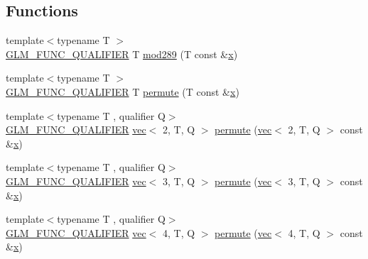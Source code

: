 \subsection*{Functions}
\begin{DoxyCompactItemize}
\item 
{\footnotesize template$<$typename T $>$ }\\\mbox{\hyperlink{setup_8hpp_a33fdea6f91c5f834105f7415e2a64407}{G\+L\+M\+\_\+\+F\+U\+N\+C\+\_\+\+Q\+U\+A\+L\+I\+F\+I\+ER}} T \mbox{\hyperlink{namespaceglm_1_1detail_a9968154b610b2b78f492b2f7babd728c}{mod289}} (T const \&\mbox{\hyperlink{_s_d_l__opengl_8h_ad0e63d0edcdbd3d79554076bf309fd47}{x}})
\item 
{\footnotesize template$<$typename T $>$ }\\\mbox{\hyperlink{setup_8hpp_a33fdea6f91c5f834105f7415e2a64407}{G\+L\+M\+\_\+\+F\+U\+N\+C\+\_\+\+Q\+U\+A\+L\+I\+F\+I\+ER}} T \mbox{\hyperlink{namespaceglm_1_1detail_adce908e01ac22b5e55c29bacbf6a37a5}{permute}} (T const \&\mbox{\hyperlink{_s_d_l__opengl_8h_ad0e63d0edcdbd3d79554076bf309fd47}{x}})
\item 
{\footnotesize template$<$typename T , qualifier Q$>$ }\\\mbox{\hyperlink{setup_8hpp_a33fdea6f91c5f834105f7415e2a64407}{G\+L\+M\+\_\+\+F\+U\+N\+C\+\_\+\+Q\+U\+A\+L\+I\+F\+I\+ER}} \mbox{\hyperlink{structglm_1_1vec}{vec}}$<$ 2, T, Q $>$ \mbox{\hyperlink{namespaceglm_1_1detail_a442b75a1f3ea4e2660ce0047245581ee}{permute}} (\mbox{\hyperlink{structglm_1_1vec}{vec}}$<$ 2, T, Q $>$ const \&\mbox{\hyperlink{_s_d_l__opengl_8h_ad0e63d0edcdbd3d79554076bf309fd47}{x}})
\item 
{\footnotesize template$<$typename T , qualifier Q$>$ }\\\mbox{\hyperlink{setup_8hpp_a33fdea6f91c5f834105f7415e2a64407}{G\+L\+M\+\_\+\+F\+U\+N\+C\+\_\+\+Q\+U\+A\+L\+I\+F\+I\+ER}} \mbox{\hyperlink{structglm_1_1vec}{vec}}$<$ 3, T, Q $>$ \mbox{\hyperlink{namespaceglm_1_1detail_aa0f0fcedee25b7de5b7174df40fef4e4}{permute}} (\mbox{\hyperlink{structglm_1_1vec}{vec}}$<$ 3, T, Q $>$ const \&\mbox{\hyperlink{_s_d_l__opengl_8h_ad0e63d0edcdbd3d79554076bf309fd47}{x}})
\item 
{\footnotesize template$<$typename T , qualifier Q$>$ }\\\mbox{\hyperlink{setup_8hpp_a33fdea6f91c5f834105f7415e2a64407}{G\+L\+M\+\_\+\+F\+U\+N\+C\+\_\+\+Q\+U\+A\+L\+I\+F\+I\+ER}} \mbox{\hyperlink{structglm_1_1vec}{vec}}$<$ 4, T, Q $>$ \mbox{\hyperlink{namespaceglm_1_1detail_a3943594f7c636dd1d021cd23f4e22441}{permute}} (\mbox{\hyperlink{structglm_1_1vec}{vec}}$<$ 4, T, Q $>$ const \&\mbox{\hyperlink{_s_d_l__opengl_8h_ad0e63d0edcdbd3d79554076bf309fd47}{x}})

\end{DoxyCompactItemize}
